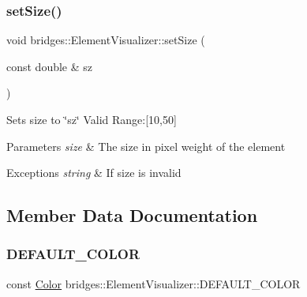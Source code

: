 \subsubsection{\texorpdfstring{set\+Size()}{setSize()}}
{\footnotesize\ttfamily void bridges\+::\+Element\+Visualizer\+::set\+Size (\begin{DoxyParamCaption}\item[{const double \&}]{sz }\end{DoxyParamCaption})\hspace{0.3cm}{\ttfamily [inline]}}

Sets size to \char`\"{}sz\char`\"{} Valid Range\+:\mbox{[}10,50\mbox{]}


\begin{DoxyParams}{Parameters}
{\em size} & The size in pixel weight of the element \\
\hline
\end{DoxyParams}

\begin{DoxyExceptions}{Exceptions}
{\em string} & If size is invalid \\
\hline
\end{DoxyExceptions}


\subsection{Member Data Documentation}
\hypertarget{classbridges_1_1_element_visualizer_ade224640b18e3f6eed42098ea0ad5b3a}{}\label{classbridges_1_1_element_visualizer_ade224640b18e3f6eed42098ea0ad5b3a} 
\subsubsection{\texorpdfstring{D\+E\+F\+A\+U\+L\+T\+\_\+\+C\+O\+L\+OR}{DEFAULT\_COLOR}}
{\footnotesize\ttfamily const \hyperlink{classbridges_1_1_color}{Color} bridges\+::\+Element\+Visualizer\+::\+D\+E\+F\+A\+U\+L\+T\+\_\+\+C\+O\+L\+OR\hspace{0.3cm}{\ttfamily [static]}}

\hypertarget{classbridges_1_1_element_visualizer_a2800a212357180e4941a818b958aabd9}{}\label{classbridges_1_1_element_visualizer_a2800a212357180e4941a818b958aabd9} 
